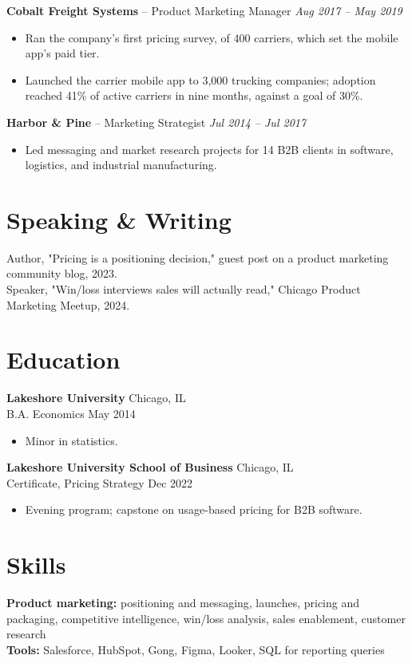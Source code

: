 \documentclass[11pt, letterpaper]{article}
\begin{document}
\vspace{2pt}
\textbf{Cobalt Freight Systems} -- {Product Marketing Manager}
\hfill \textit{Aug 2017 – May 2019}
\begin{itemize}
  \item Ran the company's first pricing survey, of 400 carriers, which set the mobile app's paid tier.
  \item Launched the carrier mobile app to 3,000 trucking companies; adoption reached 41\% of active carriers in nine months, against a goal of 30\%.
\end{itemize}
\vspace{2pt}
\textbf{Harbor \& Pine} -- {Marketing Strategist}
\hfill \textit{Jul 2014 – Jul 2017}
\begin{itemize}
  \item Led messaging and market research projects for 14 B2B clients in software, logistics, and industrial manufacturing.
\end{itemize}
\vspace{2pt}
\section{Speaking \& Writing}

Author, "Pricing is a positioning decision," guest post on a product marketing community blog, 2023. \\
Speaker, "Win/loss interviews sales will actually read," Chicago Product Marketing Meetup, 2024.

\section{Education}

\textbf{Lakeshore University} \hfill Chicago, IL \\
B.A. Economics \hfill May 2014
\begin{itemize}
  \item Minor in statistics.
\end{itemize}
\vspace{0pt}
\textbf{Lakeshore University School of Business} \hfill Chicago, IL \\
Certificate, Pricing Strategy \hfill Dec 2022
\begin{itemize}
  \item Evening program; capstone on usage-based pricing for B2B software.
\end{itemize}
\vspace{0pt}
\section{Skills}

\textbf{Product marketing:} positioning and messaging, launches, pricing and packaging, competitive intelligence, win/loss analysis, sales enablement, customer research \\
\textbf{Tools:} Salesforce, HubSpot, Gong, Figma, Looker, SQL for reporting queries


\par{}
\end{document}
